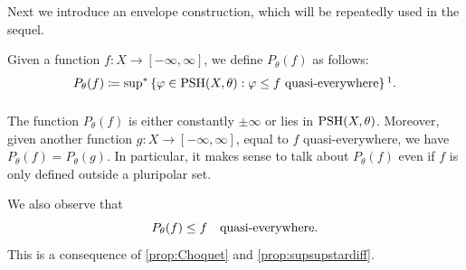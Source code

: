 Next we introduce an envelope construction, which will be repeatedly used in the sequel.
\begin{definition}\label{def:Pthetaf}
    Given a function $f\colon X\rightarrow [-\infty,\infty]$, we define $P_{\theta}(f)$ as follows:
    \begin{equation}\label{eq:Pthetafdef}
    P_{\theta}(f)\coloneqq \uscsup \left\{ \varphi\in \PSH(X,\theta): \varphi\leq f\textup{ quasi-everywhere} \right\}\footnotemark.
    \end{equation}
\end{definition}
The function $P_{\theta}(f)$ is either constantly $\pm\infty$ or lies in $\mathrm{PSH}(X,\theta)$. Moreover, given another function $g\colon X\rightarrow [-\infty,\infty]$, equal to $f$ quasi-everywhere, we have $P_{\theta}(f)=P_{\theta}(g)$. In particular, it makes sense to talk about $P_{\theta}(f)$ even if $f$ is only defined outside a pluripolar set.

We also observe that
\begin{equation}\label{eq:Pthetafleqfqe}
P_{\theta}(f)\leq f\quad\textup{quasi-everywhere}.
\end{equation}
This is a consequence of \cref{prop:Choquet} and \cref{prop:supsupstardiff}.




